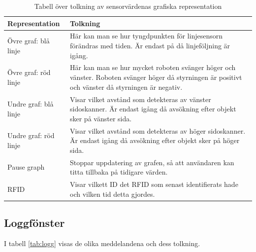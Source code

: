 \documentclass[a4paper,12pt]{article}
\begin{document}
\begin{table}[H]
    \centering
    \begin{tabularx}{\textwidth}{|l|X|}
        \hline \textbf{Representation} & \textbf{Tolkning} \\ \hline
        Övre graf: blå linje & Här kan man se hur tyngdpunkten för linjesensorn förändras med tiden. Är endast på då linjeföljning är igång.\\ \hline
        Övre graf: röd linje & Här kan man se hur mycket roboten svänger höger och vänster. Roboten svänger höger då styrningen är positivt och vänster då styrningen är negativ.\\ \hline
        Undre graf: blå linje & Visar vilket avstånd som detekteras av vänster sidoskanner. Är endast igång då avsökning efter objekt sker på vänster sida. \\ \hline
        Undre graf: röd linje & Visar vilket avstånd som detekteras av höger sidoskanner. Är endast igång då avsökning efter objekt sker på höger sida. \\ \hline
        Pause graph & Stoppar uppdatering av grafen, så att användaren kan titta tillbaka på tidigare värden.\\ \hline
        RFID & Visar vilkett ID det RFID som senast identifierats hade och vilken tid detta gjordes. \\ \hline
    \end{tabularx}
\caption{Tabell över tolkning av sensorvärdenas grafiska representation}
\label{tab:sensor}
\end{table}

\subsection{Loggfönster}
\label{subsec:logg}
I tabell \ref{tab:logg} visas de olika meddelandena och dess tolkning.
\end{document}
